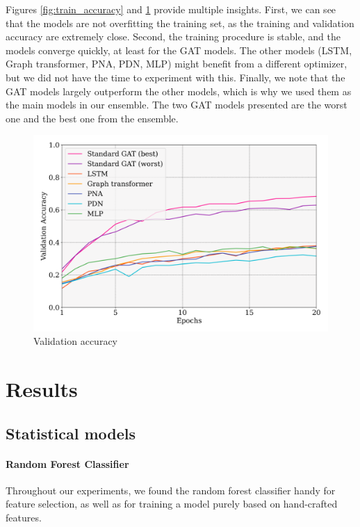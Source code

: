 \documentclass[switch, 11pt]{article}
\begin{document}
\begin{multicols}{2}
    Figures \ref{fig:train_accuracy} and \ref{fig:val_accuracy} provide multiple insights. First, we can see that the models are not overfitting the training set, as the training and validation accuracy are extremely close. Second, the training procedure is stable, and the models converge quickly, at least for the GAT models. The other models (LSTM, Graph transformer, PNA, PDN, MLP) might benefit from a different optimizer, but we did not have the time to experiment with this. Finally, we note that the GAT models largely outperform the other models, which is why we used them as the main models in our ensemble. The two GAT models presented are the worst one and the best one from the ensemble.

    \begin{figure}[H]
        \centering
        \includegraphics[width=\columnwidth]{figures/val_accuracy.png}
        \caption{Validation accuracy}
        \label{fig:val_accuracy}
    \end{figure}

    \section{Results}
    \subsection{Statistical models}
    \paragraph{Random Forest Classifier}
    Throughout our experiments, we found the random forest classifier handy for feature selection, as well as for training a model purely based on hand-crafted features.


\end{multicols}
\end{document}
